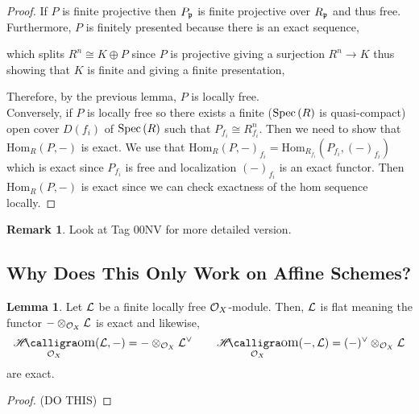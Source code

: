 \documentclass[12pt]{extarticle}
\DeclareMathOperator{\calHom}{\mathscr{H}\text{\kern -3pt {\calligra\large om}}}
\newcommand{\shHom}[3]{\calHom_{#1} \! \left( #2, #3 \right)}
\newcommand{\Hom}[3]{\mathrm{Hom}_{#1}\left( #2, #3 \right)}
\theoremstyle{definition}
\newtheorem{lemma}[theorem]{Lemma}
\newtheorem{remark}{Remark}
\begin{document}
\begin{proof}
If $P$ is finite projective then $P_{\mathfrak{p}}$ is finite projective over $R_{\mathfrak{p}}$ and thus free. Furthermore, $P$ is finitely presented because there is an exact sequence,
\begin{center}
\end{center}
which splits $R^n \cong K \oplus P$ since $P$ is projective giving a surjection $R^n \to K$ thus showing that $K$ is finite and giving a finite presentation,
\begin{center}
\end{center}
Therefore, by the previous lemma, $P$ is locally free. 
\bigskip\\
Conversely, if $P$ is locally free so there exists a finite ($\mathrm{Spec}\left(R\right)$ is quasi-compact) open cover $D(f_i)$ of $\mathrm{Spec}\left(R\right)$ such that $P_{f_i} \cong R_{f_i}^n$. Then we need to show that $\Hom{R}{P}{-}$ is exact. We use that $\Hom{R}{P}{-}_{f_i} = \Hom{R_{f_i}}{P_{f_i}}{(-)_{f_i}}$ which is exact since $P_{f_i}$ is free and localization $(-)_{f_i}$ is an exact functor. Then $\Hom{R}{P}{-}$ is exact since we can check exactness of the hom sequence locally. 
\end{proof}

\begin{remark}
Look at Tag 00NV for more detailed version.
\end{remark}

\subsection{Why Does This Only Work on Affine Schemes?}

\begin{lemma}
Let $\mathcal{L}$ be a finite locally free $\mathcal{O}_{X}$-module. Then, $\mathcal{L}$ is flat meaning the functor $- \otimes_{\mathcal{O}_{X}} \mathcal{L}$ is exact and likewise,
\[ \shHom{\struct{X}}{\L}{-} = - \otimes_{\struct{X}} \L^\vee \quad \quad \shHom{\struct{X}}{-}{\L} = (-)^\vee \otimes_{\struct{X}} \L \]
are exact. 
\end{lemma}

\begin{proof}
(DO THIS) 
\end{proof}
\end{document}
